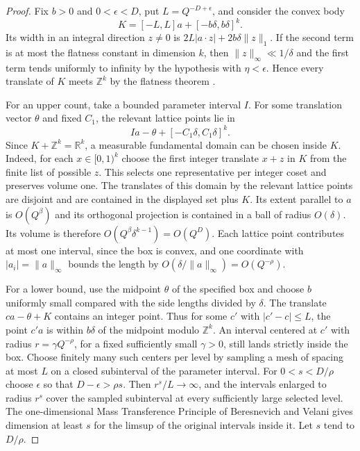 \documentclass[11pt,reqno,a4paper]{amsart}
\theoremstyle{remark}
\begin{document}
\begin{proof}
Fix \(b>0\) and \(0<\epsilon<D\), put \(L=Q^{-D+\epsilon}\), and
consider the convex body
\[
 K=[-L,L]a+[-b\delta,b\delta]^k.
\]
Its width in an integral direction \(z\ne0\) is
\(2L|a\cdot z|+2b\delta\|z\|_1\). If the second term is at most the
flatness constant in dimension \(k\), then \(\|z\|_\infty\ll1/\delta\)
and the first term tends uniformly to infinity by the hypothesis
with \(\eta<\epsilon\). Hence every translate of \(K\) meets
\(\mathbb Z^k\) by the flatness theorem \cite{met-flatness}.

For an upper count, take a bounded parameter interval \(I\). For
some translation vector \(\theta\) and fixed \(C_1\), the relevant
lattice points lie in
\[
 I a-\theta+[-C_1\delta,C_1\delta]^k.
\]
Since \(K+\mathbb Z^k=\mathbb R^k\), a measurable fundamental domain
can be chosen inside \(K\). Indeed, for each \(x\in[0,1)^k\) choose
the first integer translate \(x+z\) in \(K\) from the finite list of
possible \(z\). This selects one representative per integer coset
and preserves volume one. The translates of this domain by the
relevant lattice points are disjoint and are contained in the
displayed set plus \(K\). Its extent parallel to \(a\) is
\(O(Q^\beta)\) and its orthogonal projection is contained in a ball
of radius \(O(\delta)\). Its volume is therefore
\(O(Q^\beta\delta^{k-1})=O(Q^D)\). Each lattice point contributes
at most one interval, since the box is convex, and one coordinate
with \(|a_i|=\|a\|_\infty\) bounds the length by
\(O(\delta/\|a\|_\infty)=O(Q^{-\rho})\).

For a lower bound, use the midpoint \(\theta\) of the specified box
and choose \(b\) uniformly small compared with the side lengths
divided by \(\delta\). The translate \(ca-\theta+K\) contains an
integer point. Thus for some \(c'\) with \(|c'-c|\leq L\), the point
\(c'a\) is within \(b\delta\) of the midpoint modulo
\(\mathbb Z^k\). An interval centered at \(c'\) with radius
\(r=\gamma Q^{-\rho}\), for a fixed sufficiently small \(\gamma>0\),
still lands strictly inside the box. Choose finitely many such
centers per level by sampling a mesh of spacing at most \(L\) on a
closed subinterval of the parameter interval. For
\(0<s<D/\rho\) choose \(\epsilon\) so that \(D-\epsilon>\rho s\).
Then \(r^s/L\to\infty\), and the intervals enlarged to radius
\(r^s\) cover the sampled subinterval at every sufficiently large
selected level. The one-dimensional Mass Transference Principle
of Beresnevich and Velani \cite[Theorem~2]{met-mtp} gives dimension
at least \(s\) for the limsup of the original intervals inside it.
Let \(s\) tend to \(D/\rho\).
\end{proof}
\end{document}
